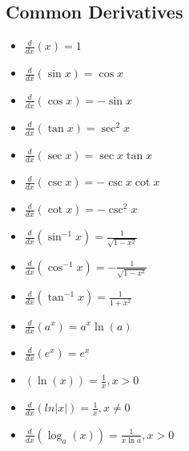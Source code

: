 \documentclass[a4paper, 10pt]{article}
\begin{document}
\subsection{Common Derivatives}
\begin{multicols}{2}
    \begin{itemize}
        \item[] \( \frac{d}{dx}(x) = 1 \)
        \item[] \( \frac{d}{dx}(\sin{x}) = \cos{x} \)
        \item[] \( \frac{d}{dx}(\cos{x}) = -\sin{x} \)
        \item[] \( \frac{d}{dx}(\tan{x}) = \sec^2x \)
        \item[] \( \frac{d}{dx}(\sec x) = \sec x\tan x \)
        \item[] \( \frac{d}{dx}(\csc x) = -\csc x\cot x \)
        \item[] \( \frac{d}{dx}(\cot x) = -\csc^2 x \)
        \item[] \( \frac{d}{dx}\left(\sin^{-1}x\right) = \frac{1}{\sqrt{1-x^2}} \)
        \item[] \( \frac{d}{dx}\left(\cos^{-1}x\right) = -\frac{1}{\sqrt{1-x^2}} \)
        \item[] \( \frac{d}{dx}\left(\tan^{-1}x\right) = \frac{1}{1+x^2} \)
        \item[] \( \frac{d}{dx}\left(a^x\right) = a^x\ln(a) \)
        \item[]  \( \frac{d}{dx}\left(e^x\right) = e^x \)
        \item[] \( \left(\ln(x)\right) = \frac{1}{x}, x > 0 \)
        \item[] \( \frac{d}{dx}(ln\lvert x\rvert) = \frac{1}{x}, x\neq0 \)
        \item[] \( \frac{d}{dx}\left(\log_a(x)\right) = \frac{1}{x\ln a}, x > 0 \)
    \end{itemize}
\end{multicols}
\end{document}
